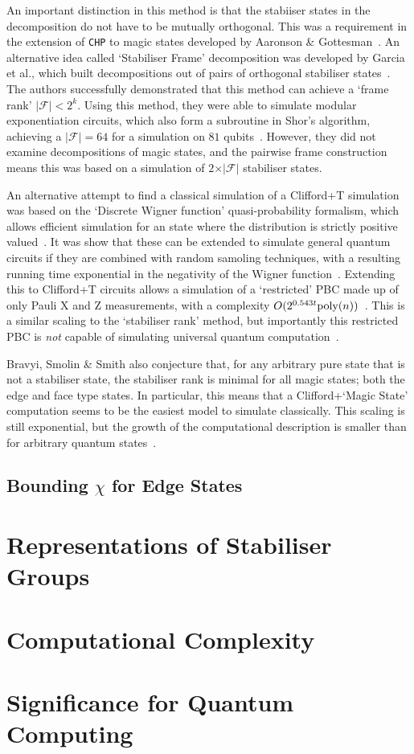 \documentclass{standalone}
\begin{document}
An important distinction in this method is that the stabiiser states in the decomposition do not have to be mutually orthogonal. This was a requirement in the extension of \texttt{CHP} to magic states developed by Aaronson \& Gottesman~\cite{Aaronson2004a,Garcia2012}. An alternative idea called `Stabiliser Frame' decomposition was developed by Garcia et al., which built decompositions out of pairs of orthogonal stabiliser states~\cite{Garcia2012,Garcia2015}. The authors successfully demonstrated that this method can achieve a `frame rank' $\vert\mathcal{F}\vert < 2^{k}$. Using this method, they were able to simulate modular exponentiation circuits, which also form a subroutine in Shor's algorithm, achieving a $\vert\mathcal{F}\vert=64$ for a simulation on $81$ qubits~\cite{Garcia2015}. However, they did not examine decompositions of magic states, and the pairwise frame construction means this was based on a simulation of $2\times\vert\mathcal{F}\vert$ stabiliser states.
\par
An alternative attempt to find a classical simulation of a Clifford+T simulation was based on the `Discrete Wigner function' quasi-probability formalism, which allows efficient simulation for an state where the distribution is strictly positive valued~\cite{Veitch2012,Howard2014}. It was show that these can be extended to simulate general quantum circuits if they are combined with random samoling techniques, with a resulting running time exponential in the negativity of the Wigner function~\cite{Bravyi2015,Pashayan2015}. Extending this to Clifford+T circuits allows a simulation of a `restricted' PBC made up of only Pauli X and Z measurements, with a complexity $O(2^{0.543 t}\text{poly}(n))$~\cite{Bravyi2015,Delfosse2015}. This is a similar scaling to the `stabiliser rank' method, but importantly this restricted PBC is \emph{not} capable of simulating universal quantum computation~\cite{Bravyi2015}.
\par
Bravyi, Smolin \& Smith also conjecture that, for any arbitrary pure state that is not a stabiliser state, the stabiliser rank is minimal for all magic states; both the edge and face type states. In particular, this means that a Clifford+`Magic State' computation seems to be the easiest model to simulate classically. This scaling is still exponential, but the growth of the computational description is smaller than for arbitrary quantum states~\cite{Bravyi2015}. 
\subsection{Bounding $\chi$ for Edge States}\label{sec:edgebound}
\section{Representations of Stabiliser Groups}
\section{Computational Complexity}
\section{Significance for Quantum Computing}
\ifstandalone

\fi
\end{document}
